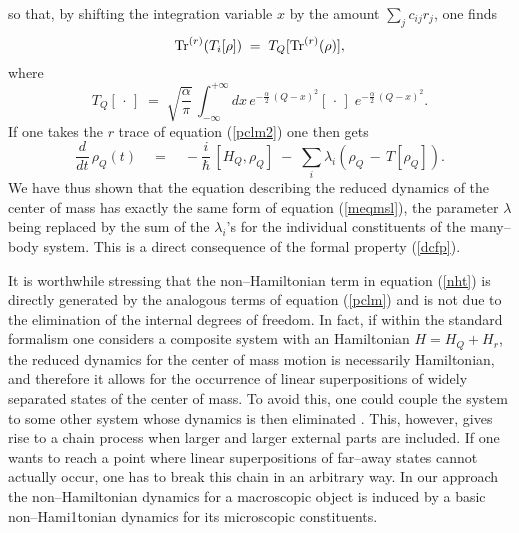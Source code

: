 \documentclass[10pt,a4paper]{article}
\begin{document}
so that, by shifting the integration variable $x$ by the amount
$\sum_{j} c_{ij} r_{j}$, one finds
\begin{equation} \label{dcfp}
\makebox{Tr}^{(r)}(T_{i}[\rho])\; = \; T_{Q}[
\makebox{Tr}^{(r)}(\rho)],
\end{equation}
where
\begin{equation}
T_{Q}[\,\cdot\,] \; = \; \sqrt{\frac{\alpha}{\pi}}\,
\int_{-\infty}^{+\infty} dx\, e^{\displaystyle -
\frac{\alpha}{2}\, (Q - x)^{2}} [\,\cdot\,]\; e^{\displaystyle -
\frac{\alpha}{2}\, (Q - x)^{2}}.
\end{equation}
If one takes the $r$ trace of equation (\ref{pclm2}) one then gets
\begin{equation} \label{nht}
\frac{d}{dt}\, \rho_{Q}(t) \quad = \quad -\frac{i}{\hbar}\,
[H_{Q}, \rho_{Q}] \; - \; \sum_{i} \lambda_{i} \left(\rho_{Q}\, -
\, T[\rho_{Q}]\right).
\end{equation}
We have thus shown that the equation describing the reduced
dynamics of the center  of mass has exactly the same form of
equation (\ref{meqmsl}), the parameter $\lambda$ being replaced by
the sum of the $\lambda_{i}$'s for the individual constituents of
the many--body system. This is a direct consequence of the formal
property (\ref{dcfp}).

It is worthwhile stressing that the non--Hamiltonian term in
equation (\ref{nht}) is directly generated by the analogous terms
of equation (\ref{pclm}) and is not due to the elimination of the
internal degrees of freedom. In fact, if within the standard
formalism one considers a composite system with an Hamiltonian $H
= H_{Q} + H_{r}$, the reduced dynamics for the center  of mass
motion is necessarily Hamiltonian, and therefore it allows for the
occurrence of linear superpositions of widely separated  states of
the center   of mass. To avoid this, one could couple the system
to some other system whose dynamics is then eliminated
\cite{krauqm}. This, however, gives rise to a chain process when
larger and larger external parts are included. If one wants to
reach a point where linear superpositions of far--away states
cannot actually occur, one has to break this chain in an arbitrary
way. In our approach the non--Hamiltonian dynamics for a
macroscopic object is induced by a basic non--Hami1tonian dynamics
for its microscopic constituents.
\end{document}
